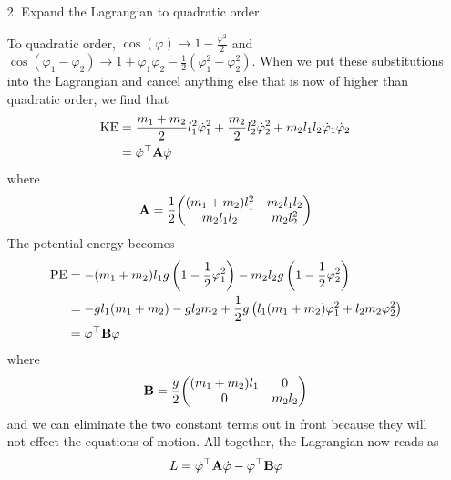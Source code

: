 \documentclass[a4paper,twoside]{article}
\begin{document}
\begin{itemize}
\begin{problem}
\begin{equation}
            \end{equation}
        \end{problem}
    \item[2.] Expand the Lagrangian to quadratic order.
        \begin{problem}
            To quadratic order, $ \cos(\varphi) \to 1 - \frac{\varphi^2}{2} $ and $ \cos(\varphi_1 - \varphi_2) \to 1 + \varphi_1 \varphi_2 - \frac{1}{2} \left( \varphi_1^2 - \varphi_2^2 \right) $. When we put these substitutions into the Lagrangian and cancel anything else that is now of higher than quadratic order, we find that
            \begin{align}
                \text{KE} &= \frac{m_1 + m_2}{2} l_1^2 \dot{\varphi}_1^2 + \frac{m_2}{2} l_2^2 \dot{\varphi}_2^2 + m_2 l_1 l_2 \dot{\varphi}_1 \dot{\varphi}_2 \\
                &= \dot{\vb{\varphi}}^\top \vb{A} \dot{\vb{\varphi}}
            \end{align}
            where
            \begin{equation}
                \vb{A} = \frac{1}{2} \mqty( (m_1 + m_2)l_1^2 & m_2 l_1 l_2 \\ m_2 l_1 l_2 & m_2 l_2^2)
            \end{equation}
            The potential energy becomes
            \begin{align}
                \text{PE} &= - (m_1 + m_2)l_1 g \left( 1 - \frac{1}{2} \varphi_1^2 \right) - m_2 l_2 g \left( 1 - \frac{1}{2} \varphi_2^2 \right) \\
                &= - g l_1 (m_1 + m_2) - g l_2 m_2 + \frac{1}{2} g \left( l_1 (m_1 + m_2) \varphi_1^2 + l_2 m_2 \varphi_2^2 \right) \\
                &= \vb{\varphi}^\top \vb{B} \vb{\varphi}
            \end{align}
            where
            \begin{equation}
                \vb{B} = \frac{g}{2} \mqty( (m_1 + m_2)l_1 & 0 \\ 0 & m_2 l_2)
            \end{equation}
            and we can eliminate the two constant terms out in front because they will not effect the equations of motion. All together, the Lagrangian now reads as
            \begin{equation}
                L = \dot{\vb{\varphi}}^\top \vb{A} \dot{\vb{\varphi}} - \vb{\varphi}^\top \vb{B} \vb{\varphi}
            \end{equation}
        \end{problem}

\end{itemize}
\end{document}
